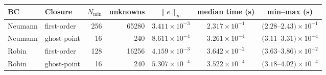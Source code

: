 \begin{tabular}{@{}llrrccc@{}}\toprule
BC & Closure & $N_\mathrm{min}$ & unknowns & $\|e\|_\infty$ & median time (s) & min--max (s)\\\midrule
Neumann & first-order & 256 & 65280 & $3.411\times10^{-3}$ & $2.317\times10^{-1}$ & $(2.28$--$2.43)\times10^{-1}$\\
Neumann & ghost-point & 16 & 240 & $8.611\times10^{-4}$ & $3.261\times10^{-4}$ & $(3.11$--$3.31)\times10^{-4}$\\
Robin & first-order & 128 & 16256 & $4.159\times10^{-3}$ & $3.642\times10^{-2}$ & $(3.63$--$3.86)\times10^{-2}$\\
Robin & ghost-point & 16 & 240 & $5.307\times10^{-4}$ & $3.522\times10^{-4}$ & $(3.18$--$4.02)\times10^{-4}$\\
\bottomrule\end{tabular}
